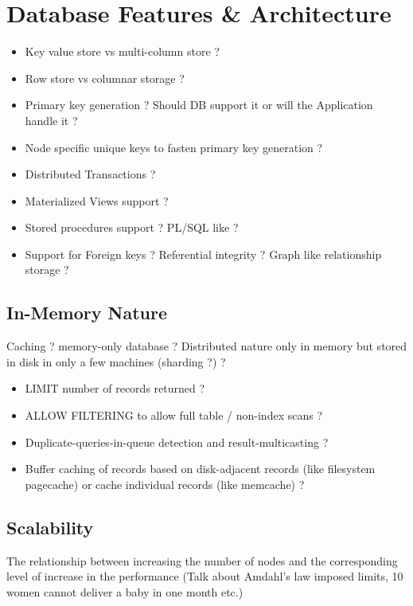 \section{Database Features & Architecture}

\begin{itemize}
\item Key value store vs multi-column store ?
\end{itemize}
\begin{itemize}
\item Row store vs columnar storage ?
\end{itemize}
\begin{itemize}
\item Primary key generation ? Should DB support it or will the Application handle it ?
\end{itemize}
\begin{itemize}
\item Node specific unique keys to fasten primary key generation ?
\end{itemize}
\begin{itemize}
\item Distributed Transactions ?
\end{itemize}
\begin{itemize}
\item Materialized Views support ?
\end{itemize}
\begin{itemize}
\item Stored procedures support ? PL/SQL like ?
\end{itemize}
\begin{itemize}
\item Support for Foreign keys ? Referential integrity ? Graph like relationship storage ?
\end{itemize}

\subsection{In-Memory Nature}
Caching ?
memory-only database ?
Distributed nature only in memory but stored in disk in only a few machines (sharding ?) ?

\begin{itemize}
\item LIMIT number of records returned ?
\end{itemize}
\begin{itemize}
\item ALLOW FILTERING to allow full table / non-index scans ?
\end{itemize}
\begin{itemize}
\item Duplicate-queries-in-queue detection and result-multicasting ?
\end{itemize}
\begin{itemize}
\item Buffer caching of records based on disk-adjacent records (like filesystem pagecache) or cache individual records (like memcache) ?
\end{itemize}

\subsection{Scalability}
The relationship between increasing the number of nodes and the corresponding level of increase in the performance (Talk about Amdahl's law imposed limits, 10 women cannot deliver a baby in one month etc.)
